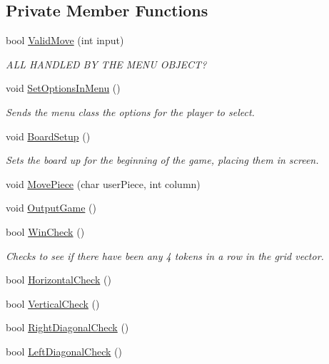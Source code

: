 \subsection*{Private Member Functions}
\begin{DoxyCompactItemize}
\item 
bool \hyperlink{classConnectFour_a1cbd5ba040359e265c85a27407528915}{Valid\-Move} (int input)
\begin{DoxyCompactList}\small\item\em A\-L\-L H\-A\-N\-D\-L\-E\-D B\-Y T\-H\-E M\-E\-N\-U O\-B\-J\-E\-C\-T? \end{DoxyCompactList}\item 
void \hyperlink{classConnectFour_a58bd5328672a5c6d95fde740a4131eeb}{Set\-Options\-In\-Menu} ()
\begin{DoxyCompactList}\small\item\em Sends the menu class the options for the player to select. \end{DoxyCompactList}\item 
void \hyperlink{classConnectFour_ad453f2707d1ae7bb87cdd2d46010d951}{Board\-Setup} ()
\begin{DoxyCompactList}\small\item\em Sets the board up for the beginning of the game, placing them in screen. \end{DoxyCompactList}\item 
void \hyperlink{classConnectFour_a6bde7d38a9493ea5475a0a941f4c96df}{Move\-Piece} (char user\-Piece, int column)
\item 
void \hyperlink{classConnectFour_aeec5d9114f72805796129ebd6e94c6d8}{Output\-Game} ()
\item 
bool \hyperlink{classConnectFour_a4f7dd5550d9ba548c542d887822cc1f0}{Win\-Check} ()
\begin{DoxyCompactList}\small\item\em Checks to see if there have been any 4 tokens in a row in the grid vector. \end{DoxyCompactList}\item 
bool \hyperlink{classConnectFour_aad3b75c20b82a21fcbe648e7ee134a4b}{Horizontal\-Check} ()
\item 
bool \hyperlink{classConnectFour_afe5fd24730a5d1295c1bb20fc2e6c1a8}{Vertical\-Check} ()
\item 
bool \hyperlink{classConnectFour_ac49d716bde974c19aab3e47e66d94073}{Right\-Diagonal\-Check} ()
\item 
bool \hyperlink{classConnectFour_acacb2e213d7c4f6dec2cf2f9d3c370f9}{Left\-Diagonal\-Check} ()

\end{DoxyCompactItemize}
